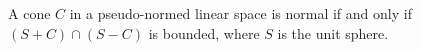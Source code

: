 A cone $C$ in a pseudo-normed linear space is normal if and only if $(S + C) \cap (S - C)$ is bounded, where $S$ is the unit sphere.
